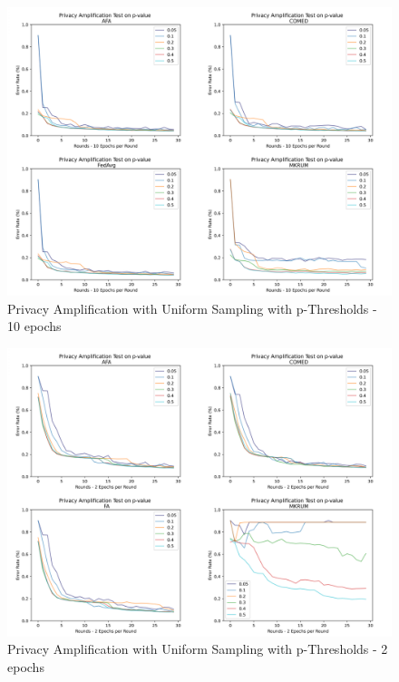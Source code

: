 \begin{figure}[htbp]
	\centering
    \includegraphics[scale=0.07]{free_riders/graphs/p_test.png}
	\caption{Privacy Amplification with Uniform Sampling with p-Thresholds - 10 epochs}
	\label{fig:p_test}
\end{figure}

\begin{figure}[htbp]
	\centering
    \includegraphics[scale=0.07]{free_riders/graphs/p_test_2.png}
	\caption{Privacy Amplification with Uniform Sampling with p-Thresholds - 2 epochs}
	\label{fig:p_test_2}
\end{figure}

